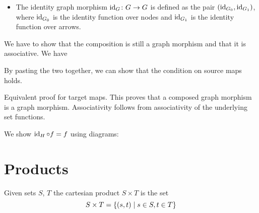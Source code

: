 \documentclass{scrartcl}
\newenvironment{category}{\begin{itemize}[leftmargin=.9in]}{\end{itemize}}
\newcommand{\catid}[1]{\item[\textbf{Identity}] #1}
\newenvironment{diags}[1][0pt]{\begin{center}\vspace{#1}%
    \def\diagsspaceafter{#1}}{%
    \vspace{\diagsspaceafter}\end{center}}
\begin{document}
\begin{example}
\begin{category}
    \catid{The identity graph morphism $\id_G \colon G \to G$ is
      defined as the pair $(\operatorname{id}_{G_0}, \operatorname{id}_{G_1})$, where $\operatorname{id}_{G_0}$
      is the identity function over nodes and $\operatorname{id}_{G_1}$ is the
      identity function over arrows.}
  \end{category}
  We have to show that the composition is still a graph morphism and
  that it is associative.  We have
  \begin{diags}
    \hspace{2em}
  \end{diags}
  By pasting the two together, we can show that the condition on source
  maps holds.
  \begin{diags}
  \end{diags}
  Equivalent proof for target maps.  This proves that a composed graph
  morphism is a graph morphism.  Associativity follows from
  associativity of the underlying set functions.

  We show $\operatorname{id}_H \circ f = f$ using diagrams:
  \begin{diags}
  \end{diags}
\end{example}


\section{Products}

\begin{example}
  Given sets $S$, $T$ the cartesian product $S \times T$ is the set
  \[
  S \times T = \left\{ \left( s, t \right) \mid s \in S, t \in T \right\}
  \]
\end{example}
\end{document}
